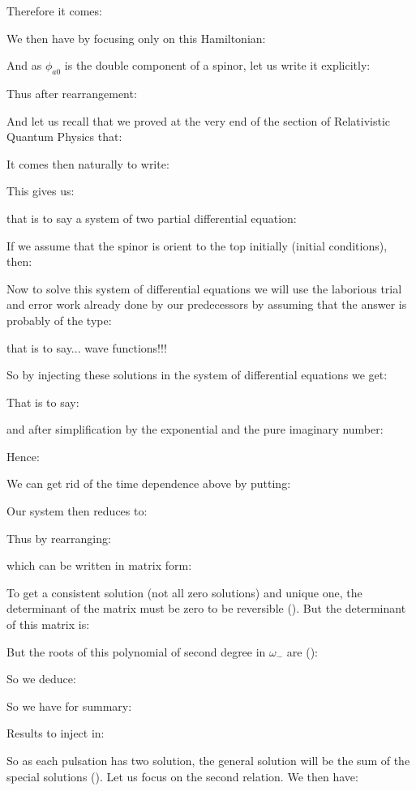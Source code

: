 	Therefore it comes:
	
	We then have by focusing only on this Hamiltonian:
	
	And as $\phi_{a0}$ is the double component of a spinor, let us write it explicitly:
	
	Thus after rearrangement:
	
	And let us recall that we proved at the very end of the section of Relativistic Quantum Physics that:
	
	It comes then naturally to write:
	
	This gives us:
	
	that is to say a system of two partial differential equation:
	
	If we assume that the spinor is orient to the top initially (initial conditions), then:
	
	Now to solve this system of differential equations we will use the laborious trial and error work already done by our predecessors by assuming that the answer is probably of the type:
	
	that is to say... wave functions!!!
	
	So by injecting these solutions in the system of differential equations we get:
	
	That is to say:
	
	and after simplification by the exponential and the pure imaginary number:
	
	Hence:
	
	We can get rid of the time dependence above by putting:
	
	Our system then reduces to:
	
	Thus by rearranging:
	
	which can be written in matrix form:
	
	To get a consistent solution (not all zero solutions) and unique one, the determinant of the matrix must be zero to be reversible (). But the determinant of this matrix is:
	
	But the roots of this polynomial of second degree in $\omega_{-}$ are ():
	
	So we deduce:
	
	So we have for summary:
	
	Results to inject in:
	
	So as each pulsation has two solution, the general solution will be the sum of the special solutions (). Let us focus on the second relation. We then have:
	
